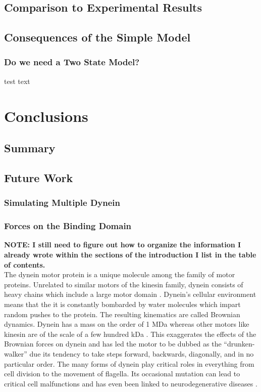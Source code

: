 \documentclass[a4paper, 11pt]{article}
\begin{document}
	\subsection{Comparison to Experimental Results}
	\subsection{Consequences of the Simple Model}
		\subsubsection{Do we need a Two State Model?}
		test text 
\section{Conclusions}
	\subsection{Summary}
	\subsection{Future Work}
		\subsubsection{Simulating Multiple Dynein}
		\subsubsection{Forces on the Binding Domain} 
		\vspace{2em}
		\textbf{NOTE: I still need to figure out how to organize the information I already wrote within the sections of the introduction I list in the table of contents.}\\

		The dynein motor protein is a unique molecule among the family of motor proteins. Unrelated to similar motors of the kinesin family, dynein consists of heavy chains which include a large motor domain \cite{alberts_molecular_2002}. Dynein’s cellular environment means that the it is constantly bombarded by water molecules which impart random pushes to the protein. The resulting kinematics are called Brownian dynamics. Dynein has a mass on the order of 1 MDa whereas other motors like kinesin are of the scale of a few hundred kDa \cite{johnson_structure_1983}. This exaggerates the effects of the Brownian forces on dynein and has led the motor to be dubbed  as the “drunken-walker” due its tendency to take steps forward, backwards, diagonally, and in no particular order. The many forms of dynein play critical roles in everything from cell division to the movement of flagella. Its occasional mutation can lead to critical cell malfunctions and has even been linked to neurodegenerative diseases \cite{cleary_tension_2014}. 
\end{document}
